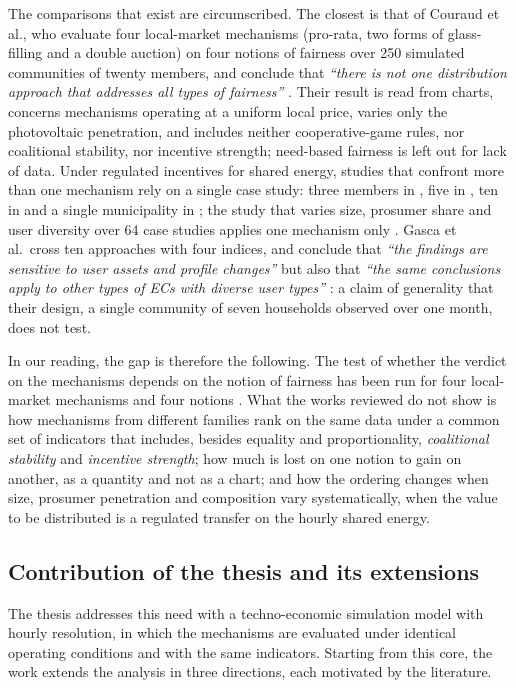 The comparisons that exist are circumscribed. The closest is that of Couraud et al., who evaluate four local-market mechanisms (pro-rata, two forms of glass-filling and a double auction) on four notions of fairness over 250 simulated communities of twenty members, and conclude that \textit{``there is not one distribution approach that addresses all types of fairness''} \cite{couraud2025}. Their result is read from charts, concerns mechanisms operating at a uniform local price, varies only the photovoltaic penetration, and includes neither cooperative-game rules, nor coalitional stability, nor incentive strength; need-based fairness is left out for lack of data. Under regulated incentives for shared energy, studies that confront more than one mechanism rely on a single case study: three members in \cite{volpato2023}, five in \cite{trevisan2024}, ten in \cite{fioriti2023} and a single municipality in \cite{campagna2024}; the study that varies size, prosumer share and user diversity over 64 case studies applies one mechanism only \cite{ferrucci2025}. Gasca et al.\ cross ten approaches with four indices, and conclude that \textit{``the findings are sensitive to user assets and profile changes''} but also that \textit{``the same conclusions apply to other types of ECs with diverse user types''} \cite{gasca2024}: a claim of generality that their design, a single community of seven households observed over one month, does not test.

In our reading, the gap is therefore the following. The test of whether the verdict on the mechanisms depends on the notion of fairness has been run for four local-market mechanisms and four notions \cite{couraud2025}. What the works reviewed do not show is how mechanisms from different families rank on the same data under a common set of indicators that includes, besides equality and proportionality, \emph{coalitional stability} and \emph{incentive strength}; how much is lost on one notion to gain on another, as a quantity and not as a chart; and how the ordering changes when size, prosumer penetration and composition vary systematically, when the value to be distributed is a regulated transfer on the hourly shared energy.

\subsection*{Contribution of the thesis and its extensions}

The thesis addresses this need with a techno-economic simulation model with hourly resolution, in which the mechanisms are evaluated under identical operating conditions and with the same indicators. Starting from this core, the work extends the analysis in three directions, each motivated by the literature.

